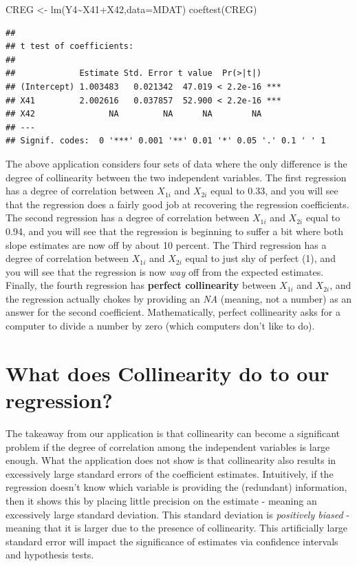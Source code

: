 \documentclass[
]{book}
\newenvironment{Shaded}{\begin{snugshade}}{\end{snugshade}}
\newcommand{\AttributeTok}[1]{\textcolor[rgb]{0.77,0.63,0.00}{#1}}
\newcommand{\FunctionTok}[1]{\textcolor[rgb]{0.00,0.00,0.00}{#1}}
\newcommand{\NormalTok}[1]{#1}
\newcommand{\OtherTok}[1]{\textcolor[rgb]{0.56,0.35,0.01}{#1}}
\newcommand{\SpecialCharTok}[1]{\textcolor[rgb]{0.00,0.00,0.00}{#1}}
\begin{document}
\begin{Shaded}
\begin{Highlighting}[]
\NormalTok{CREG }\OtherTok{\textless{}{-}} \FunctionTok{lm}\NormalTok{(Y4}\SpecialCharTok{\textasciitilde{}}\NormalTok{X41}\SpecialCharTok{+}\NormalTok{X42,}\AttributeTok{data=}\NormalTok{MDAT)}
\FunctionTok{coeftest}\NormalTok{(CREG)}
\end{Highlighting}
\end{Shaded}

\begin{verbatim}
## 
## t test of coefficients:
## 
##             Estimate Std. Error t value  Pr(>|t|)    
## (Intercept) 1.003483   0.021342  47.019 < 2.2e-16 ***
## X41         2.002616   0.037857  52.900 < 2.2e-16 ***
## X42               NA         NA      NA        NA    
## ---
## Signif. codes:  0 '***' 0.001 '**' 0.01 '*' 0.05 '.' 0.1 ' ' 1
\end{verbatim}

The above application considers four sets of data where the only difference is the degree of collinearity between the two independent variables. The first regression has a degree of correlation between \(X_{1i}\) and \(X_{2i}\) equal to 0.33, and you will see that the regression does a fairly good job at recovering the regression coefficients. The second regression has a degree of correlation between \(X_{1i}\) and \(X_{2i}\) equal to 0.94, and you will see that the regression is beginning to suffer a bit where both slope estimates are now off by about 10 percent. The Third regression has a degree of correlation between \(X_{1i}\) and \(X_{2i}\) equal to just shy of perfect (1), and you will see that the regression is now \emph{way} off from the expected estimates. Finally, the fourth regression has \textbf{perfect collinearity} between \(X_{1i}\) and \(X_{2i}\), and the regression actually chokes by providing an \emph{NA} (meaning, not a number) as an answer for the second coefficient. Mathematically, perfect collinearity asks for a computer to divide a number by zero (which computers don't like to do).

\hypertarget{what-does-collinearity-do-to-our-regression}{%
\section{What does Collinearity do to our regression?}\label{what-does-collinearity-do-to-our-regression}}

The takeaway from our application is that collinearity can become a significant problem if the degree of correlation among the independent variables is large enough. What the application does not show is that collinearity also results in excessively large standard errors of the coefficient estimates. Intuitively, if the regression doesn't know which variable is providing the (redundant) information, then it shows this by placing little precision on the estimate - meaning an excessively large standard deviation. This standard deviation is \emph{positively biased} - meaning that it is larger due to the presence of collinearity. This artificially large standard error will impact the significance of estimates via confidence intervals and hypothesis tests.
\end{document}
